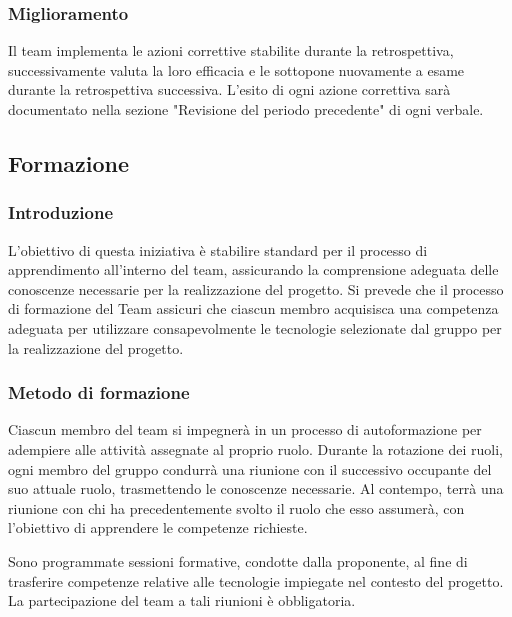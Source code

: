\subsubsection{Miglioramento}
Il team implementa le azioni correttive stabilite durante la retrospettiva, successivamente valuta la loro efficacia e le sottopone nuovamente a esame durante la retrospettiva successiva.
L’esito di ogni azione correttiva sarà documentato nella sezione "Revisione del periodo precedente" di ogni verbale.

\subsection{Formazione}
\subsubsection{Introduzione}
L’obiettivo di questa iniziativa è stabilire standard per il processo di apprendimento all’interno del team, assicurando la comprensione adeguata delle conoscenze necessarie per la realizzazione del progetto.
Si prevede che il processo di formazione del Team assicuri che ciascun membro acquisisca una competenza adeguata per utilizzare consapevolmente le tecnologie selezionate dal gruppo per la realizzazione del progetto.

\subsubsection{Metodo di formazione}
Ciascun membro del team si impegnerà in un processo di autoformazione per adempiere alle attività assegnate al proprio ruolo. Durante la rotazione dei ruoli, ogni membro del gruppo condurrà una riunione con il successivo occupante del suo attuale ruolo, trasmettendo le conoscenze necessarie. Al contempo, terrà una riunione con chi ha precedentemente svolto il ruolo che esso assumerà, con l’obiettivo di apprendere le competenze richieste.

Sono programmate sessioni formative, condotte dalla proponente, al fine di trasferire competenze relative alle tecnologie impiegate nel contesto del progetto. La partecipazione del team a tali riunioni è obbligatoria.



